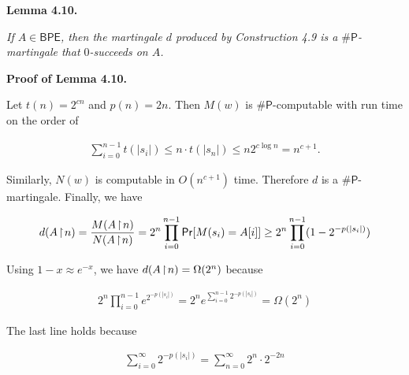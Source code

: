 \documentclass[10pt,a4paper]{article}
\begin{document}


\par\medskip\noindent\textbf{
\textbf{Lemma 4.10}\textbf{.}
}\par



\emph{If $A\in\mathsf{BPE}$, then the martingale $d$ produced by Construction 4.9 is a ${\mathsf{\#}\mathsf{P}}$-martingale that $0$-succeeds on $A$.}\par






\par\medskip\noindent\textbf{Proof of Lemma 4.10.}\par




Let $t(n)=2^{cn}$ and $p(n)=2n$. Then
$M(w)$ is ${\mathsf{\#}\mathsf{P}}$-computable with run time on the order of\par


\[\begin{gathered}
\sum_{i=0}^{n-1}t(|s_{i}|)\leq n\cdot t(|s_{n}|)\leq n2^{c\log n}=n^{c+1}.
\end{gathered}\]


Similarly,
$N(w)$ is computable in $O(n^{c+1})$ time. Therefore $d$ is a ${\mathsf{\#}\mathsf{P}}$-martingale.
Finally, we have\par


\[\begin{gathered}
d(A\negthinspace\upharpoonright\negthinspace n)=\frac{M(A\negthinspace\upharpoonright\negthinspace n)}{N(A\negthinspace\upharpoonright\negthinspace n)}=2^{n}\prod_{i=0}^{n-1}\mathsf{Pr}[M(s_{i})=A[i]]\geq 2^{n}\prod_{i=0}^{n-1}(1-2^{-p(|s_{i}|)})
\end{gathered}\]


Using $1-x\approx e^{-x}$, we have $d(A\negthinspace\upharpoonright\negthinspace n)=\Omega(2^{n})$ because\par


\[\begin{gathered}
2^{n}\prod_{i=0}^{n-1}e^{2^{-p(|s_{i}|)}}=2^{n}e^{\sum\limits_{i=0}^{n-1}2^{-p(|s_{i}|)}}=\Omega(2^{n})
\end{gathered}\]


The last line holds because\par


\[\begin{gathered}
\sum_{i=0}^{\infty}2^{-p(|s_{i}|)}=\sum_{n=0}^{\infty}2^{n}\cdot 2^{-2n}
\end{gathered}\]
\end{document}
